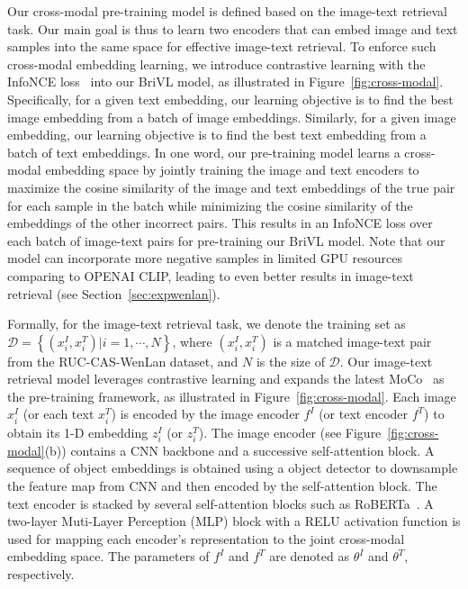 \documentclass[10pt,twocolumn,letterpaper]{article}
\begin{document}
Our cross-modal pre-training model is defined based on the image-text retrieval task. Our main goal is thus to learn two encoders that can embed image and text samples into the same space for effective image-text retrieval.
To enforce such cross-modal embedding learning, we introduce contrastive learning with the InfoNCE loss~\cite{oord2018representation} into our BriVL model, as illustrated in Figure~\ref{fig:cross-modal}. Specifically, for a given text embedding, our learning objective is to find the best image embedding from a batch of image embeddings. Similarly, for a given image embedding, our learning objective is to find the best text embedding from a batch of text embeddings.
In one word, our pre-training model learns a cross-modal embedding space by jointly training the image and text encoders to maximize the cosine similarity of the image and text embeddings of the true pair for each sample in the batch while minimizing the cosine similarity of the embeddings of the other incorrect pairs.
This results in an InfoNCE loss over each batch of image-text pairs for pre-training our BriVL model.
Note that our model can incorporate more negative samples in limited GPU resources comparing to OPENAI CLIP, leading to even better results in image-text retrieval (see Section~\ref{sec:expwenlan}).

Formally, for the image-text retrieval task, we denote the training set as $\mathcal{D} = \left\{(x^I_{i}, x^T_{i})| i=1,\cdots,N \right\}$, where $(x^I_{i}, x^T_{i})$ is a matched image-text pair from the RUC-CAS-WenLan dataset, and $N$ is the size of $\mathcal{D}$.
Our image-text retrieval model leverages contrastive learning and expands the latest MoCo~\cite{he2020momentum} as the pre-training framework, as illustrated in Figure~\ref{fig:cross-modal}. Each image $x^I_{i}$ (or each text $x^T_{i}$) is encoded by the image encoder $f^{I}$ (or text encoder $f^{T}$) to obtain its 1-D embedding  $z_{i}^I$ (or $z_{i}^T$). The image encoder (see Figure~\ref{fig:cross-modal}(b)) contains a CNN backbone and a successive self-attention block. A sequence of object embeddings is obtained using a object detector to downsample the feature map from CNN and then encoded by the self-attention block. The text encoder is stacked by several self-attention blocks such as RoBERTa~\cite{liu2019roberta}.
A two-layer Muti-Layer Perception (MLP) block with a RELU activation function is used for mapping each encoder’s representation to the joint cross-modal embedding space.
The parameters of $f^{I}$ and $f^{T}$ are denoted as $\theta^{I}$ and $\theta^{T}$, respectively.
\end{document}
